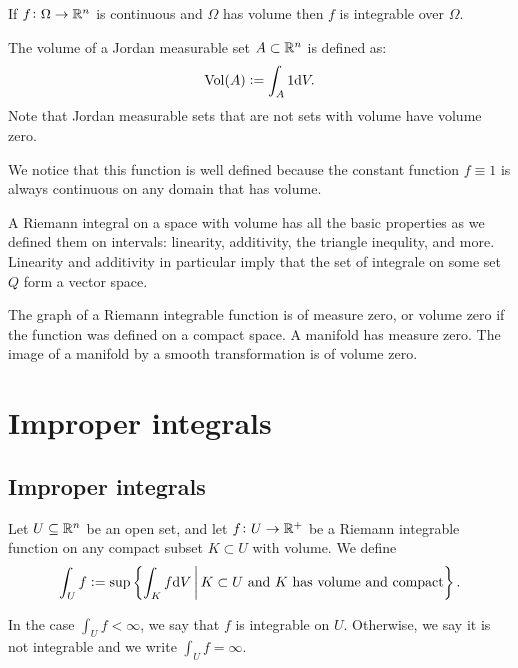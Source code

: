 \documentclass[11pt,a4paper]{article}
\begin{document}
\begin{proposition}
  If $f \colon \Omega \to \mathbb{R}^n$ is continuous and $\Omega$
  has volume then $f$ is integrable over $\Omega$.
\end{proposition}

\begin{definition}
  The volume of a Jordan measurable set $A \subset \mathbb{R}^n$ is 
  defined as:
  \[
    \operatorname{Vol}(A) := \int_{A} 1 \mathrm{d} V.
  \]
  Note that Jordan measurable sets that are not sets with volume have
  volume zero.
\end{definition}

\begin{remark}
  We notice that this function is well defined because the constant
  function $f \equiv 1$ is always continuous on any domain that
  has volume.
\end{remark}

\begin{remark}
  A Riemann integral on a space with volume has all the basic
  properties as we defined them on intervals: linearity,
  additivity, the triangle inequlity, and more.
  Linearity and additivity in particular imply that the set of
  integrale on some set $Q$ form a vector space.
\end{remark}

\begin{theorem}
  The graph of a Riemann integrable function is of measure 
  zero, or volume zero if the function was defined on a
  compact space. A manifold has measure zero. The image
  of a manifold by a smooth transformation is of volume zero. 
\end{theorem}

\newpage

\section{Improper integrals}
\subsection{Improper integrals}
\begin{definition}
  Let $U \subseteq \mathbb{R}^n$ be an open set,
  and let $f \colon U \to \mathbb{R}^+$ be a Riemann integrable function
  on any compact subset $K \subset U$ with volume.
  We define
  \[
    \int_{U} f :=
    \sup\left\{\int_{K} f \mathrm{d} V \,\middle\vert\,
      K \subset U \text{ and } K \text{ has volume and compact}\right\}.
  \]
\end{definition}
\begin{remark}
  In the case $\int_{U} f < \infty$,
  we say that $f$ is integrable on $U$.
  Otherwise, we say it is not integrable and we write $\int_{U} f = \infty$.
\end{remark}
\end{document}
